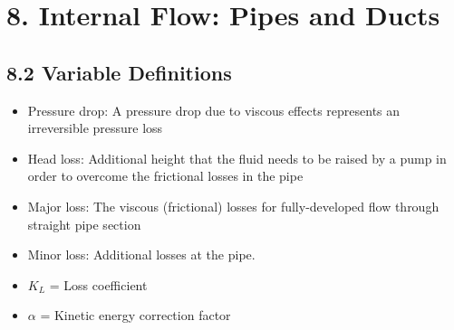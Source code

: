 \section*{8. Internal Flow: Pipes and Ducts}
\subsection*{8.2 Variable Definitions}
\begin{itemize}
    \item Pressure drop: A pressure drop due to viscous effects represents an irreversible pressure loss
    \item Head loss: Additional height that the fluid needs to be raised by a pump in order to overcome the frictional losses in the pipe
    \item Major loss: The viscous (frictional) losses for fully-developed flow through straight pipe section
    \item Minor loss: Additional losses at the pipe. 
    \item $K_L$ = Loss coefficient
    \item $\alpha$ = Kinetic energy correction factor
\end{itemize}

